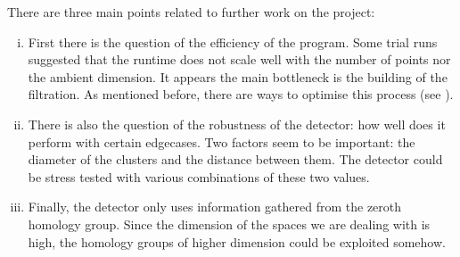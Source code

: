 \documentclass[../main.tex]{subfiles}
\begin{document}
There are three main points related to further work on the project:
\begin{enumerate}[(i)]
	\item First there is the question of the efficiency of the program. Some trial runs
		suggested that the runtime does not scale well with the number of points nor the
		ambient dimension. It appears the main bottleneck is the building of the filtration.
		As mentioned before, there are ways to optimise this process (see \cite{tidyset}). 
	\item There is also the question of the robustness of the detector: how well does it
		perform with certain edgecases. Two factors seem to be important: the diameter of the
		clusters and the distance between them. The detector could be stress tested with
		various combinations of these two values. 
	\item Finally, the detector only uses information gathered from the zeroth homology
		group. Since the dimension of the spaces we are dealing with is high, the homology
		groups of higher dimension could be exploited somehow. 
\end{enumerate}
\end{document}

